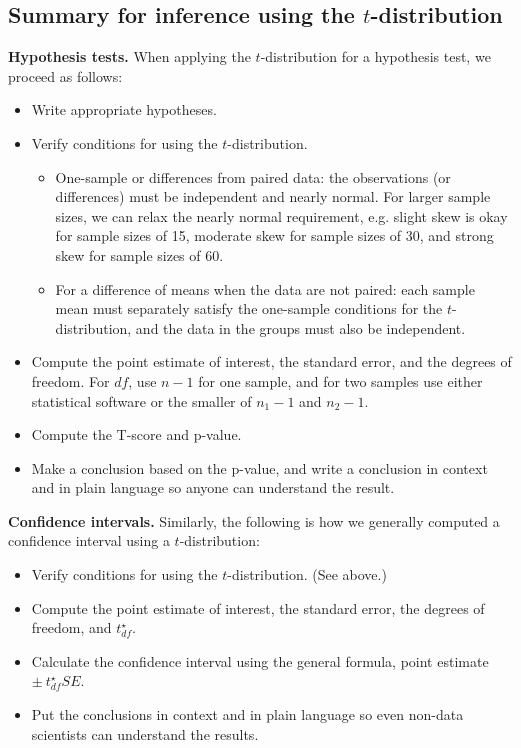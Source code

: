 {\subsection{Summary for inference using the $t$-distribution}


\textbf{Hypothesis tests.} When applying the $t$-distribution for a hypothesis test, we proceed as follows:
\begin{itemize}
\setlength{\itemsep}{0mm}
\item Write appropriate hypotheses.
\item Verify conditions for using the $t$-distribution.
\begin{itemize}
\item One-sample or differences from paired data: the observations (or differences) must be independent and nearly normal. For larger sample sizes, we can relax the nearly normal requirement, e.g. slight skew is okay for sample sizes of 15, moderate skew for sample sizes of 30, and strong skew for sample sizes of 60.
\item For a difference of means when the data are not paired: each sample mean must separately satisfy the one-sample conditions for the $t$-distribution, and the data in the groups must also be independent.
\end{itemize}
\item Compute the point estimate of interest, the standard error, and the degrees of freedom. For $df$, use $n-1$ for one sample, and for two samples use either statistical software or the smaller of $n_1 - 1$ and $n_2 - 1$.
\item Compute the T-score and p-value.
\item Make a conclusion based on the p-value, and write a conclusion in context and in plain language so anyone can understand the result.
\end{itemize}
\noindent\textbf{Confidence intervals.} Similarly, the following is how we generally computed a confidence interval using a $t$-distribution:
\begin{itemize}
\item Verify conditions for using the $t$-distribution. (See above.)
\item Compute the point estimate of interest, the standard error, the degrees of freedom, and $t^{\star}_{df}$.
\item Calculate the confidence interval using the general formula, point estimate $\pm\ t_{df}^{\star} SE$.
\item Put the conclusions in context and in plain language so even non-data scientists can understand the results.
\end{itemize}

}
